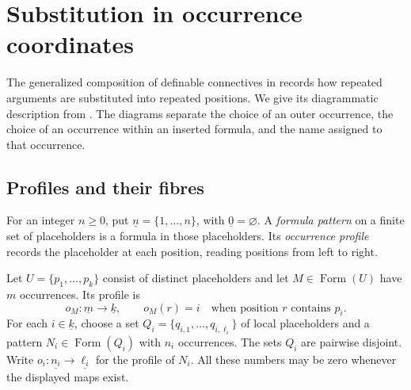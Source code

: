 \documentclass[11pt]{article}
\newcommand{\FormulaSet}{\operatorname{Form}}
\begin{document}
\appendix
\section{Substitution in occurrence coordinates}\label{app:substitution}

The generalized composition of definable connectives in
\cite[\S2.5, pp.~45--46]{DP} records how repeated arguments are
substituted into repeated positions. We give its diagrammatic description
from \cite[\S\S9.2--9.3]{Notation}. The diagrams separate the choice of
an outer occurrence, the choice of an occurrence within an inserted
formula, and the name assigned to that occurrence.

\subsection{Profiles and their fibres}\label{app:profiles}

For an integer $n\geq0$, put $\underline n=\{1,\ldots,n\}$, with
$\underline0=\varnothing$. A \emph{formula pattern} on a finite set
of placeholders is a formula in those placeholders. Its
\emph{occurrence profile} records the placeholder at each position,
reading positions from left to right.

Let $U=\{p_1,\ldots,p_k\}$ consist of distinct placeholders and let
$M\in\FormulaSet(U)$ have $m$ occurrences. Its profile is
\[
 o_M:\underline m\longrightarrow\underline k,
 \qquad o_M(r)=i\quad\text{when position $r$ contains $p_i$}.
\]
For each $i\in\underline k$, choose a set
$Q_i=\{q_{i,1},\ldots,q_{i,\ell_i}\}$ of local placeholders and a
pattern $N_i\in\FormulaSet(Q_i)$ with $n_i$ occurrences. The sets
$Q_i$ are pairwise disjoint. Write
$o_i:\underline{n_i}\to\underline{\ell_i}$ for the profile of $N_i$.
All these numbers may be zero whenever the displayed maps exist.
\end{document}
